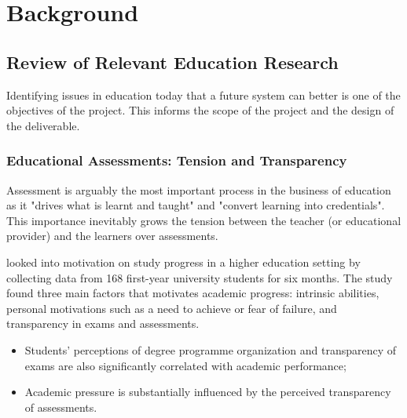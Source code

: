 
\chapter{Background}

    \graphicspath{{Chapter2/Figs/Raster/}{Chapter2/Figs/PDF/}{Chapter2/Figs/}}

\section{Review of Relevant Education Research}

Identifying issues in education today that a future system can better is one of the objectives of 
the project. This informs the scope of the project and the design of the deliverable.

\subsection{Educational Assessments: Tension and Transparency}

Assessment is arguably the most important process in the business of education as it "drives what 
is learnt and taught" and "convert learning into credentials". \citep[p.160]{campbell2010digital} 
This importance inevitably grows the tension between the teacher (or educational provider) and the 
learners over assessments. 




\citet{suhre2013determinants} looked into motivation on study progress in a higher education setting by collecting data 
from 168 first-year university students for six months. The study found three main factors that motivates academic 
progress: intrinsic abilities, personal motivations such as a need to achieve or fear of failure, and transparency in 
exams and assessments. 
\begin{itemize}
  \item Students' perceptions of degree programme organization and transparency of exams are also 
  significantly correlated with academic performance;
  \item Academic pressure is substantially influenced by the perceived transparency of assessments.
\end{itemize}

